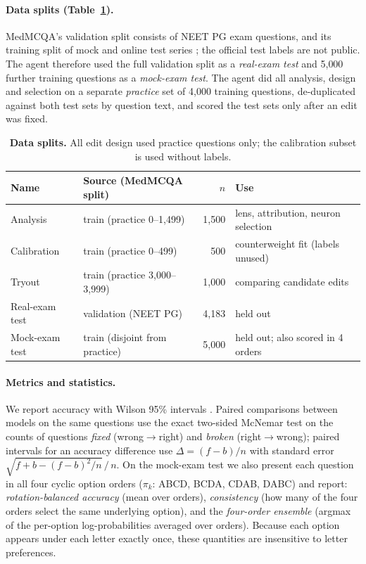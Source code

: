 \documentclass[11pt]{article}
\begin{document}
\paragraph{Data splits (Table~\ref{tab:splits}).} MedMCQA's validation split consists of NEET PG exam questions, and its training split of mock and online test series \citep{pal2022medmcqa}; the official test labels are not public. The agent therefore used the full validation split as a \emph{real-exam test} and 5{,}000 further training questions as a \emph{mock-exam test}. The agent did all analysis, design and selection on a separate \emph{practice} set of 4{,}000 training questions, de-duplicated against both test sets by question text, and scored the test sets only after an edit was fixed.

\begin{table}[t]
\centering\small
\caption{\textbf{Data splits.} All edit design used practice questions only; the calibration subset is used without labels.}
\label{tab:splits}
\begin{tabular}{llrl}
\toprule
Name & Source (MedMCQA split) & $n$ & Use \\
\midrule
Analysis & train (practice 0--1{,}499) & 1{,}500 & lens, attribution, neuron selection \\
Calibration & train (practice 0--499) & 500 & counterweight fit (labels unused) \\
Tryout & train (practice 3{,}000--3{,}999) & 1{,}000 & comparing candidate edits \\
\midrule
Real-exam test & validation (NEET PG) & 4{,}183 & held out \\
Mock-exam test & train (disjoint from practice) & 5{,}000 & held out; also scored in 4 orders \\
\bottomrule
\end{tabular}
\end{table}

\paragraph{Metrics and statistics.} We report accuracy with Wilson 95\% intervals \citep{wilson1927}. Paired comparisons between models on the same questions use the exact two-sided McNemar test \citep{mcnemar1947} on the counts of questions \emph{fixed} (wrong$\to$right) and \emph{broken} (right$\to$wrong); paired intervals for an accuracy difference use $\Delta=(f-b)/n$ with standard error $\sqrt{f+b-(f-b)^2/n}\,/\,n$. On the mock-exam test we also present each question in all four cyclic option orders ($\pi_k$: ABCD, BCDA, CDAB, DABC) and report: \emph{rotation-balanced accuracy} (mean over orders), \emph{consistency} (how many of the four orders select the same underlying option), and the \emph{four-order ensemble} (argmax of the per-option log-probabilities averaged over orders). Because each option appears under each letter exactly once, these quantities are insensitive to letter preferences.
\end{document}
